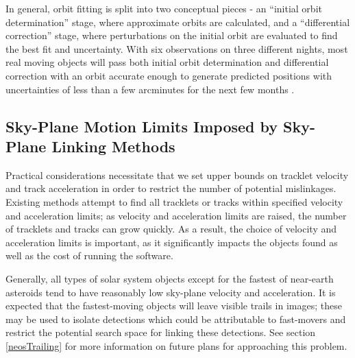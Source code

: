 In general, orbit fitting is split into two conceptual pieces - an
``initial orbit determination'' stage, where approximate orbits are
calculated, and a ``differential correction'' stage, where
perturbations on the initial orbit are evaluated to find the best fit
and uncertainty. With six observations on three different nights, most
real moving objects will pass both initial orbit determination and
differential correction with an orbit accurate enough to generate
predicted positions with uncertainties of less than a few arcminutes
for the next few months \citep{basicSolarSystem}.





\subsection{Sky-Plane Motion Limits Imposed by Sky-Plane Linking Methods}

Practical considerations necessitate that we set upper bounds on
tracklet velocity and track acceleration in order to restrict the
number of potential mislinkages. Existing methods attempt to find all
tracklets or tracks within specified velocity and acceleration limits;
as velocity and acceleration limits are raised, the number of
tracklets and tracks can grow quickly.  As a result, the choice of
velocity and acceleration limits is important, as it significantly
impacts the objects found as well as the cost of running the software.

Generally, all types of solar system objects except for the fastest of
near-earth asteroids tend to have reasonably low sky-plane velocity
and acceleration. It is expected that the fastest-moving objects will
leave visible trails in images; these may be used to isolate
detections which could be attributable to fast-movers and restrict the
potential search space for linking these detections.  See section
\ref{neosTrailing} for more information on future plans for
approaching this problem.  

